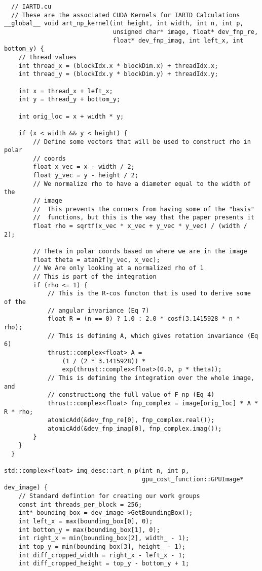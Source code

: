 \begin{lstlisting}
  // IARTD.cu
  // These are the associated CUDA Kernels for IARTD Calculations
__global__ void art_np_kernel(int height, int width, int n, int p,
                              unsigned char* image, float* dev_fnp_re,
                              float* dev_fnp_imag, int left_x, int bottom_y) {
    // thread values
    int thread_x = (blockIdx.x * blockDim.x) + threadIdx.x;
    int thread_y = (blockIdx.y * blockDim.y) + threadIdx.y;

    int x = thread_x + left_x;
    int y = thread_y + bottom_y;

    int orig_loc = x + width * y;

    if (x < width && y < height) {
        // Define some vectors that will be used to construct rho in polar
        // coords
        float x_vec = x - width / 2;
        float y_vec = y - height / 2;
        // We normalize rho to have a diameter equal to the width of the
        // image
        //  This prevents the corners from having some of the "basis"
        //  functions, but this is the way that the paper presents it
        float rho = sqrtf(x_vec * x_vec + y_vec * y_vec) / (width / 2);

        // Theta in polar coords based on where we are in the image
        float theta = atan2f(y_vec, x_vec);
        // We Are only looking at a normalized rho of 1
        // This is part of the integration
        if (rho <= 1) {
            // This is the R-cos functon that is used to derive some of the
            // angular invariance (Eq 7)
            float R = (n == 0) ? 1.0 : 2.0 * cosf(3.1415928 * n * rho);
            // This is defining A, which gives rotation invariance (Eq 6)
            thrust::complex<float> A =
                (1 / (2 * 3.1415928)) *
                exp(thrust::complex<float>(0.0, p * theta));
            // This is defining the integration over the whole image, and
            // constructiong the full value of F_np (Eq 4)
            thrust::complex<float> fnp_complex = image[orig_loc] * A * R * rho;
            atomicAdd(&dev_fnp_re[0], fnp_complex.real());
            atomicAdd(&dev_fnp_imag[0], fnp_complex.imag());
        }
    }
  }

std::complex<float> img_desc::art_n_p(int n, int p,
                                      gpu_cost_function::GPUImage* dev_image) {
    // Standard defintion for creating our work groups
    const int threads_per_block = 256;
    int* bounding_box = dev_image->GetBoundingBox();
    int left_x = max(bounding_box[0], 0);
    int bottom_y = max(bounding_box[1], 0);
    int right_x = min(bounding_box[2], width_ - 1);
    int top_y = min(bounding_box[3], height_ - 1);
    int diff_cropped_width = right_x - left_x - 1;
    int diff_cropped_height = top_y - bottom_y + 1;


\end{lstlisting}
